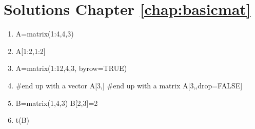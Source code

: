 

\setcounter{MaxMatrixCols}{20}
\usepackage{enumerate}
\usepackage{Sweave}




\chapter*{Solutions Chapter \ref{chap:basicmat}}


\begin{enumerate}
\item 
\begin{Schunk}
\begin{Sinput}
 A=matrix(1:4,4,3)
\end{Sinput}
\end{Schunk}
\item 
\begin{Schunk}
\begin{Sinput}
 A[1:2,1:2]
\end{Sinput}
\end{Schunk}
\item
\begin{Schunk}
\begin{Sinput}
 A=matrix(1:12,4,3, byrow=TRUE)
\end{Sinput}
\end{Schunk}

\item
\begin{Schunk}
\begin{Sinput}
 #end up with a vector
 A[3,]
 #end up with a matrix
 A[3,,drop=FALSE]
\end{Sinput}
\end{Schunk}

\item
\begin{Schunk}
\begin{Sinput}
 B=matrix(1,4,3)
 B[2,3]=2
\end{Sinput}
\end{Schunk}

\item 
\begin{Schunk}
\begin{Sinput}
 t(B)
\end{Sinput}
\end{Schunk}


\end{enumerate}
